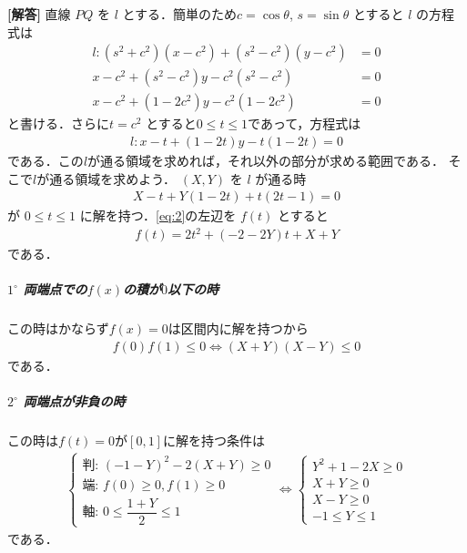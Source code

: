 \documentclass[../../main.tex]{subfiles}
\begin{document}
\begin{oframed}
  
\end{oframed}

{\bf [解答]}
直線 $PQ$ を $l$ とする．簡単のため$c = \cos\theta$, $s = \sin\theta$ とすると $l$ の方程式は
\begin{align}
  l : (s^2+c^2)(x-c^2) + (s^2-c^2)(y-c^2) &= 0 \\
  x-c^2 + (s^2-c^2)y - c^2(s^2-c^2) &= 0 \\
  x-c^2 + (1-2c^2)y - c^2(1-2c^2) &= 0
\end{align}
と書ける．さらに$t = c^2$ とすると$0\le t \le 1$であって，方程式は
\begin{align}
  l : x - t + (1-2t)y - t(1-2t) = 0 \label{eq:1}
\end{align}
である．この$l$が通る領域を求めれば，それ以外の部分が求める範囲である．
そこで$l$が通る領域を求めよう．
$(X, Y)$ を $l$ が通る時
\begin{align}
  X - t + Y(1-2t) + t(2t-1) = 0 \label{eq:2}
\end{align}
が $0 \le t \le 1$ に解を持つ．\cref{eq:2}の左辺を $f(t)$ とすると
\begin{align}
  f(t) = 2t^2 + (-2-2Y)t + X+Y
\end{align}
である．

\subparagraph{$1^\circ$ 両端点での$f(x)$の積が$0$以下の時}

この時はかならず$f(x)=0$は区間内に解を持つから
\begin{align}
  f(0)f(1) \le 0 \iff (X+Y)(X-Y) \le 0 \label{eq:3}
\end{align}
である．

\subparagraph{$2^\circ$ 両端点が非負の時}

この時は$f(t)=0$が$[0,1]$に解を持つ条件は
\begin{align}
  \begin{cases}
    \text{判: } (-1-Y)^2 - 2(X+Y) \ge 0 \\
    \text{端: } f(0) \ge 0, f(1) \ge 0 \\
    \text{軸: } 0 \le \dfrac{1+Y}{2} \le 1
  \end{cases}
  \iff
  \begin{cases}
    Y^2+1-2X \ge 0 \\
    X+Y \ge 0 \\
    X-Y \ge 0 \\
    -1 \le Y \le 1
  \end{cases} \label{eq:4}
\end{align}
である．
\casesend
\end{document}
